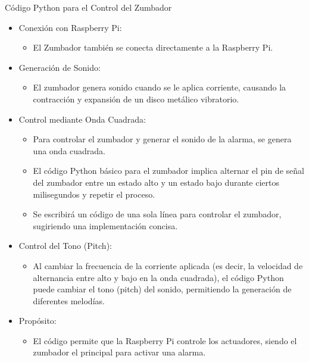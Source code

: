 \documentclass{report}
\begin{document}
Código Python para el Control del Zumbador
\begin{itemize}
    \item Conexión con Raspberry Pi: 
    \begin{itemize}
        \item El Zumbador también se conecta directamente a la Raspberry Pi.
    \end{itemize}

    \item Generación de Sonido: 
    \begin{itemize}
        \item El zumbador genera sonido cuando se le aplica corriente, causando la contracción y expansión de un disco metálico vibratorio.
    \end{itemize}

    \item Control mediante Onda Cuadrada: 
    \begin{itemize}
        \item Para controlar el zumbador y generar el sonido de la alarma, se genera una onda cuadrada.
        \item El código Python básico para el zumbador implica alternar el pin de señal del zumbador entre un estado alto y un estado bajo 
        durante ciertos milisegundos y repetir el proceso.
        \item Se escribirá un código de una sola línea para controlar el zumbador, sugiriendo una implementación concisa.
    \end{itemize}

    \item Control del Tono (Pitch): 
    \begin{itemize}
        \item Al cambiar la frecuencia de la corriente aplicada (es decir, la velocidad de alternancia entre alto y bajo en 
        la onda cuadrada), el código Python puede cambiar el tono (pitch) del sonido, permitiendo la generación de diferentes melodías.
    \end{itemize}

    \item Propósito: 
    \begin{itemize}
        \item El código permite que la Raspberry Pi controle los actuadores, siendo el zumbador el principal para activar una alarma.
    \end{itemize}
\end{itemize}
\end{document}
